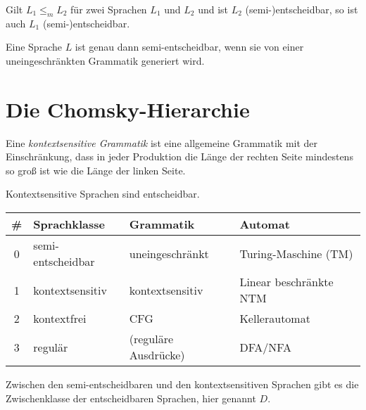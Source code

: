 \documentclass{cheat-sheet}
\begin{document}
\fbox{
  \begin{minipage}{8.5cm}
    \hfill\vspace{2.5cm}
  \end{minipage}
}

\begin{satz}
Gilt $L_{1} \le_{m} L_{2}$ für zwei Sprachen $L_{1}$ und $L_{2}$ und ist $L_{2}$ (semi-)entscheidbar, so ist auch $L_{1}$ (semi-)entscheidbar.
\end{satz}

\begin{satz}
Eine Sprache $L$ ist genau dann semi-entscheidbar, wenn sie von einer uneingeschränkten Grammatik generiert wird.
\end{satz}


\section{Die Chomsky-Hierarchie}

\begin{defn}
Eine \emph{kontextsensitive Grammatik} ist eine allgemeine Grammatik mit der Einschränkung, dass in jeder Produktion die Länge der rechten Seite mindestens so groß ist wie die Länge der linken Seite.
\end{defn}

\begin{satz}
Kontextsensitive Sprachen sind entscheidbar.
\end{satz}

\begin{center}
  \scriptsize
  \setlength{\tabcolsep}{2pt}
  \begin{tabular}{ c | l | l | l }
    \# & Sprachklasse & Grammatik & Automat \\
    \hline
    0 & semi-entscheidbar & uneingeschränkt & Turing-Maschine (TM) \\
    1 & kontextsensitiv & kontextsensitiv & Linear beschränkte NTM \\
    2 & kontextfrei & CFG & Kellerautomat \\
    3 & regulär & (reguläre Ausdrücke) & DFA/NFA
  \end{tabular}
\end{center}

\begin{bem}
  Zwischen den semi-entscheidbaren und den kontextsensitiven Sprachen gibt es die Zwischenklasse der entscheidbaren Sprachen, hier genannt $D$.
\end{bem}
\end{document}
